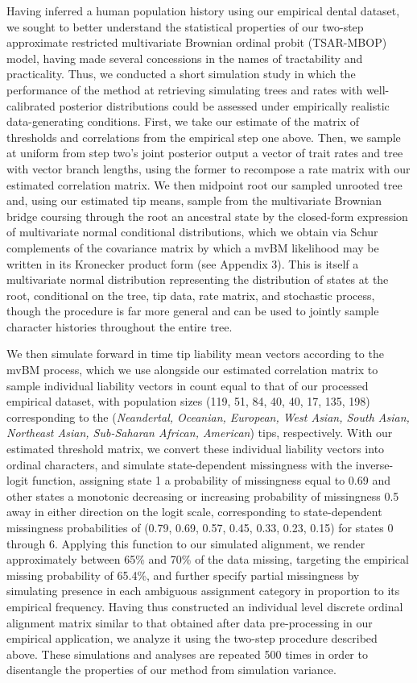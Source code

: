 \documentclass[10pt, twocolumn, twoside]{article}
\begin{document}
Having inferred a human population history using our empirical dental dataset, we sought to better understand the statistical properties of our two-step approximate restricted multivariate Brownian ordinal probit (TSAR-MBOP) model, having made several concessions in the names of tractability and practicality. Thus, we conducted a short simulation study in which the performance of the method at retrieving simulating trees and rates with well-calibrated posterior distributions could be assessed under empirically realistic data-generating conditions. First, we take our estimate of the matrix of thresholds and correlations from the empirical step one above. Then, we sample at uniform from step two's joint posterior output a vector of trait rates and tree with vector branch lengths, using the former to recompose a rate matrix with our estimated correlation matrix. We then midpoint root our sampled unrooted tree and, using our estimated tip means, sample from the multivariate Brownian bridge coursing through the root an ancestral state by the closed-form expression of multivariate normal conditional distributions, which we obtain via Schur complements of the covariance matrix by which a mvBM likelihood may be written in its Kronecker product form (see Appendix 3). This is itself a multivariate normal distribution representing the distribution of states at the root, conditional on the tree, tip data, rate matrix, and stochastic process, though the procedure is far more general and can be used to jointly sample character histories throughout the entire tree. 

We then simulate forward in time tip liability mean vectors according to the mvBM process, which we use alongside our estimated correlation matrix to sample individual liability vectors in count equal to that of our processed empirical dataset, with population sizes (119, 51, 84, 40, 40, 17, 135, 198) corresponding to the (\textit{Neandertal, Oceanian, European, West Asian, South Asian, Northeast Asian, Sub-Saharan African, American}) tips, respectively. With our estimated threshold matrix, we convert these individual liability vectors into ordinal characters, and simulate state-dependent missingness with the inverse-logit function, assigning state 1 a probability of missingness equal to 0.69 and other states a monotonic decreasing or increasing probability of missingness 0.5 away in either direction on the logit scale, corresponding to state-dependent missingness probabilities of (0.79, 0.69, 0.57, 0.45, 0.33, 0.23, 0.15) for states 0 through 6. Applying this function to our simulated alignment, we render approximately between 65\% and 70\% of the data missing, targeting the empirical missing probability of 65.4\%, and further specify partial missingness by simulating presence in each ambiguous assignment category in proportion to its empirical frequency. Having thus constructed an individual level discrete ordinal alignment matrix similar to that obtained after data pre-processing in our empirical application, we analyze it using the two-step procedure described above. These simulations and analyses are repeated 500 times in order to disentangle the properties of our method from simulation variance.
\end{document}
